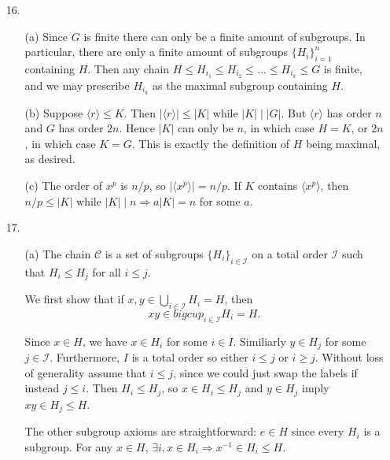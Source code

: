 \documentclass[12pt]{article}
\theoremstyle{remark}
\theoremstyle{named}
\renewcommand{\implies}{\Rightarrow}
\begin{document}
\begin{enumerate}
    \item [16.] 
    \begin{enumerate}
        \item[(a)] Since \(G\) is finite there can only be a finite amount of subgroups. In particular, there are only a finite amount of subgroups \(\{H_i\}_{i = 1}^n\) containing \(H\). Then any chain \(H \le H_{i_1} \le H_{i_2} \le \dots \le H_{i_k} \le G\) is finite, and we may prescribe \(H_{i_k}\) as the maximal subgroup containing \(H\).
        
        \item[(b)] Suppose \(\langle r \rangle \le K\). Then \(|\langle r \rangle| \le |K|\) while \(|K| \mid |G|\). But \(\langle r \rangle\) has order \(n\) and \(G\) has order \(2n\). Hence \(|K|\) can only be \(n\), in which case \(H = K\), or \(2n\), in which case \(K = G\). This is exactly the definition of \(H\) being maximal, as desired.
         
        \item[(c)] The order of \(x^p\) is \(n / p\), so \(|\langle x^p \rangle| = n / p\). If \(K\) contains \(\langle x^p \rangle\), then \(n/p \le |K|\) while \(|K| \mid n \implies a|K| = n\) for some \(a\). 
    \end{enumerate}
    \item [17.] 
    \begin{enumerate}
        \item[(a)] The chain \(\mathcal C\) is a set of subgroups \(\{H_i\}_{i \in \mathcal I}\) on a total order \(\mathcal I\) such that \(H_i \le H_j\) for all \(i \le j\). 
        
        We first show that if 
        \(x, y \in \bigcup_{i \in \mathcal I} H_i = H\), then \[xy \in bigcup_{i \in \mathcal I} H_i = H.\]

        Since \(x \in H\), we have \(x \in H_i\) for some \(i \in I\). Similiarly \(y \in H_j\) for some \(j \in \mathcal I\). Furthermore, \(I\) is a total order so either \(i \le j\) or \(i \ge j\). Without loss of generality assume that \(i \le j\), since we could just swap the labels if instead \(j \le i\). Then \(H_i \le H_j\), so \(x \in H_i \le H_j\) and \(y \in H_j\) imply \(xy \in H_j \le H\).

        The other subgroup axioms are straightforward: \(e \in H\) since every \(H_i\) is a subgroup. For any \(x \in H\), \(\exists i, x \in H_i \implies x^{-1} \in H_i \le H\). 
        

\end{enumerate}
\end{enumerate}
\end{document}
